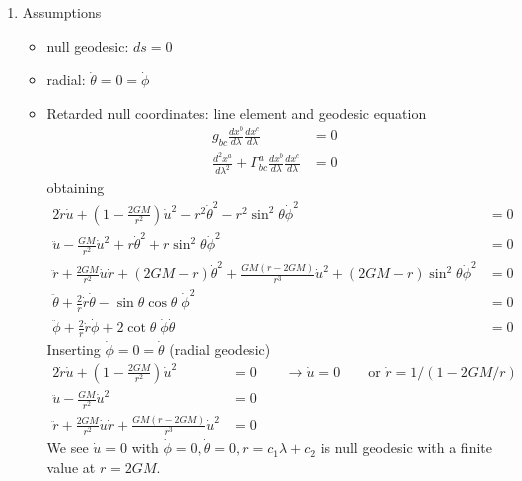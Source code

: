\documentclass[10pt,a4paper]{article}
\theoremstyle{definition}
\begin{document}
\begin{enumerate}
\item Assumptions
\begin{itemize}
\item null geodesic: $ds=0$
\item radial: $\dot{\theta}=0=\dot{\phi}$
\end{itemize}
\begin{itemize}[(a)]
\item Retarded null coordinates: line element and geodesic equation
\begin{align}
g_{bc}\frac{dx^b}{d\lambda}\frac{dx^c}{d\lambda}&=0\\
\frac{d^2x^a}{d\lambda^2}+\Gamma^a_{bc}\frac{dx^b}{d\lambda}\frac{dx^c}{d\lambda}&=0
\end{align}
obtaining
\begin{align}
2\dot{r}\dot{u}+\left(1-\frac{2GM}{r^2}\right)\dot{u}^2-r^2\dot{\theta}^2-r^2\sin^2\theta\dot{\phi}^2&=0\\
\ddot{u}-\frac{GM}{r^2}\dot{u}^2+r\dot{\theta}^2+r\sin^2\theta\dot{\phi}^2&=0\\
\ddot{r}+\frac{2GM}{r^2}\dot{u}\dot{r}+(2GM-r)\dot{\theta}^2+\frac{GM(r-2GM)}{r^3}\dot{u}^2+(2GM-r)\sin^2\theta\dot{\phi}^2&=0\\
\ddot{\theta}+\frac{2}{r}\dot{r}\dot{\theta}-\sin\theta\cos\theta\;\dot{\phi}^2&=0\\
\ddot{\phi}+\frac{2}{r}\dot{r}\dot{\phi}+2\cot\theta\;\dot{\phi}\dot{\theta}&=0
\end{align}
Inserting $\dot{\phi}=0=\dot{\theta}$ (radial geodesic)
\begin{align}
2\dot{r}\dot{u}+\left(1-\frac{2GM}{r^2}\right)\dot{u}^2&=0\qquad\rightarrow\dot{u}=0\qquad\text{or }\dot{r}=1/(1-2GM/r)\\
\ddot{u}-\frac{GM}{r^2}\dot{u}^2&=0\\
\ddot{r}+\frac{2GM}{r^2}\dot{u}\dot{r}+\frac{GM(r-2GM)}{r^3}\dot{u}^2&=0
\end{align}
We see $\dot{u}=0$ with $\dot{\phi}=0, \dot{\theta}=0, r=c_1\lambda+c_2$ is null geodesic with a finite value at $r=2GM$.


\end{itemize}
\end{enumerate}
\end{document}
